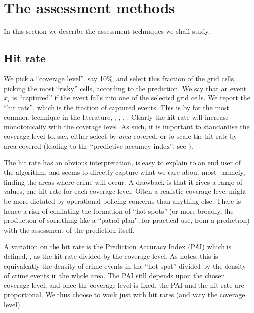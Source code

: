 \documentclass[twoside,a4paper,twocolumn,10pt]{article}
\theoremstyle{plain}
\theoremstyle{definition}
\begin{document}
\section{The assessment methods}

In this section we describe the assessment techniques we shall study.

\subsection{Hit rate}\label{sec:hit_rate_intro}

We pick a ``coverage level'', say 10\%, and select this fraction of the grid cells,
picking the most ``risky'' cells, according to the prediction.  We say that an event
$x_i$ is ``captured'' if the event falls into one of the selected grid cells.  We report
the ``hit rate'', which is the fraction of captured events.  This is by far the most
common technique in the literature, \cite{bjp}, \cite[page~20]{jbmbp},
\cite[Section~3.1]{arc}, \cite[Section~5]{sepp}.  Clearly the hit rate will increase
monotonically with the coverage level.  As such, it is important to standardise the coverage
level to, say, either select by \emph{area} covered, or to scale the hit rate by area covered
(leading to the ``predictive accuracy index'', see \cite{ctu}).

The hit rate has an obvious interpretation, is easy to explain to an end user of the
algorithm, and seems to directly capture what we care about most-- namely, finding the areas
where crime will occur.  A drawback is that it gives a range of values, one hit rate for each
coverage level.  Often a realistic coverage level might be more dictated by operational
policing concerns than anything else.  There is hence a risk of conflating the formation
of ``hot spots'' (or more broadly, the production of something like a ``patrol plan'', for
practical use, from a prediction) with the assessment of the prediction itself.

A variation on the hit rate is the Prediction Accuracy Index (PAI) which is defined,
\cite{arc, ctu}, as the hit rate divided by the coverage level.  As \cite{levine} notes,
this is equivalently the density of crime events in the ``hot spot'' divided by the density
of crime events in the whole area.  The PAI still depends upon the chosen coverage
level, and once the coverage level is fixed, the PAI and the hit rate are proportional.
We thus choose to work just with hit rates (and vary the coverage level).
\end{document}
